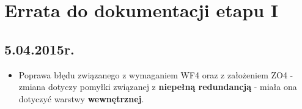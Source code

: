 \chapter{Errata do dokumentacji etapu I}

\section*{5.04.2015r.}
\begin{itemize}
\item Poprawa błędu związanego z wymaganiem WF4 oraz z założeniem ZO4 - zmiana dotyczy pomyłki związanej z \textbf{niepełną redundancją} - miała ona dotyczyć warstwy \textbf{wewnętrznej}.

\end{itemize}
